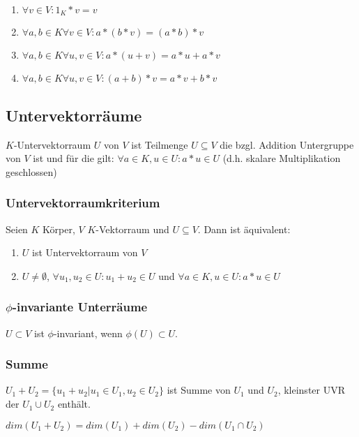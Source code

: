 \begin{enumerate}[label=(\alph*)]
	\item $\forall v \in V : 1_K * v = v$
	\item $\forall a, b \in K \forall v \in V : a*(b*v)=(a*b)*v$
	\item $\forall a, b \in K \forall u, v \in V : a*(u+v)=a*u+a*v$
	\item $\forall a, b \in K \forall u, v \in V : (a+b)*v=a*v+b*v$
\end{enumerate}

\subsection*{Untervektorräume}

$K$-Untervektorraum $U$ von $V$ ist Teilmenge $U \subseteq V$ die bzgl. Addition Untergruppe von $V$ ist und für die gilt: $\forall a \in K, u \in U : a*u \in U$ (d.h. skalare Multiplikation geschlossen)

\subsubsection*{Untervektorraumkriterium}

Seien $K$ Körper, $V$ $K$-Vektorraum und $U \subseteq V$. Dann ist äquivalent:

\begin{enumerate}[label=(\alph*)]
	\item $U$ ist Untervektorraum von $V$
	\item $U \neq \emptyset$, $\forall u_1, u_2 \in U : u_1 + u_2 \in U$ und $\forall a \in K, u \in U : a*u \in U$
\end{enumerate}

\subsubsection*{$\phi$-invariante Unterräume}

$U \subset V$ ist $\phi$-invariant, wenn $\phi(U) \subset U$.

\subsubsection*{Summe}

$U_1 + U_2 = \{u_1+u_2 | u_1 \in U_1, u_2 \in U_2 \}$ ist Summe von $U_1$ und $U_2$, kleinster UVR der $U_1 \cup U_2$ enthält.

$dim(U_1 + U_2) = dim(U_1) + dim(U_2) - dim(U_1 \cap U_2)$

